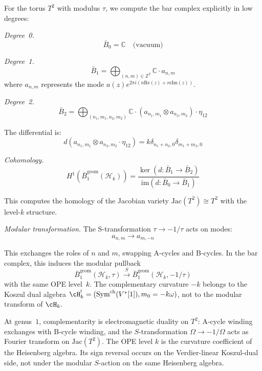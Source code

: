 \begin{example}\label{ex:heisenberg-genus1-explicit}
For the torus $T^2$ with modulus $\tau$, we compute the bar complex explicitly in low degrees:

\emph{Degree~0.}
\[\bar{B}_0 = \mathbb{C} \quad \text{(vacuum)}\]

\emph{Degree~1.}
\[\bar{B}_1 = \bigoplus_{(n,m) \in \mathbb{Z}^2} \mathbb{C} \cdot a_{n,m}\]
where $a_{n,m}$ represents the mode $a(z) e^{2\pi i(n\text{Re}(z) + m\text{Im}(z))}$.

\emph{Degree~2.}
\[\bar{B}_2 = \bigoplus_{(n_1,m_1,n_2,m_2)} \mathbb{C} \cdot (a_{n_1,m_1} \otimes a_{n_2,m_2}) \cdot \eta_{12}\]

The differential is:
\[d(a_{n_1,m_1} \otimes a_{n_2,m_2} \cdot \eta_{12}) = k\delta_{n_1+n_2,0} \delta_{m_1+m_2,0}\]

\emph{Cohomology.}
\[H^1(\bar{B}^{\text{geom}}_1(\mathcal{H}_k)) = \frac{\ker(d: \bar{B}_1 \to \bar{B}_2)}{\text{im}(d: \bar{B}_0 \to \bar{B}_1)}\]

This computes the homology of the Jacobian variety $\text{Jac}(T^2) \cong T^2$ with the level-$k$ structure.

\emph{Modular transformation.} The S-transformation $\tau \to -1/\tau$ acts on modes:
\[a_{n,m} \to a_{m,-n}\]

This exchanges the roles of $n$ and $m$, swapping A-cycles and
B-cycles. In the bar complex, this induces the modular pullback
\[
\bar{B}^{\text{geom}}_1(\mathcal{H}_k,\tau)
\xrightarrow{S}
\bar{B}^{\text{geom}}_1(\mathcal{H}_k,-1/\tau)
\]
with the same OPE level~$k$. The complementary curvature
$-k$ belongs to the Koszul dual algebra
$\cH_k^!=(\mathrm{Sym}^{\mathrm{ch}}(V^*[1]),m_0=-k\omega)$, not to the
modular transform of $\cH_k$.
\end{example}

\begin{remark}\label{rem:heisenberg-physics}
At genus~$1$, complementarity is electromagnetic duality on $T^2$:
A-cycle winding exchanges with B-cycle winding, and the
$S$-transformation $\Omega \to -1/\Omega$ acts as Fourier transform
on $\mathrm{Jac}(T^2)$. The OPE level $k$ is the curvature
coefficient of the Heisenberg algebra. Its sign reversal occurs on
the Verdier-linear Koszul-dual side, not under the modular
$S$-action on the same Heisenberg algebra.
\end{remark}

